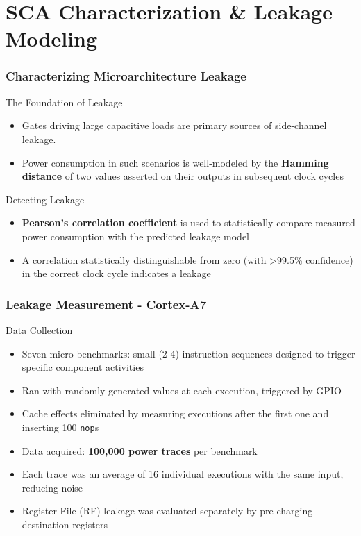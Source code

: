 \section{SCA Characterization \& Leakage Modeling}

\begin{frame}
    \frametitle{Characterizing Microarchitecture Leakage}
    \begin{block}{The Foundation of Leakage}
        \begin{itemize}
            \item Gates driving large capacitive loads are primary sources of side-channel leakage.
            \item Power consumption in such scenarios is well-modeled by the \textbf{Hamming distance} of two values asserted on their outputs in subsequent clock cycles
        \end{itemize}   
    \end{block}

    \begin{block}{Detecting Leakage}
        \begin{itemize}
            \item \textbf{Pearson's correlation coefficient} is used to statistically compare measured power consumption with the predicted leakage model
            \item A correlation statistically distinguishable from zero (with >99.5\% confidence) in the correct clock cycle indicates a leakage
        \end{itemize}
    \end{block}
\end{frame}


\begin{frame}
    \frametitle{Leakage Measurement - Cortex-A7}
    \begin{block}{Data Collection}
        \begin{itemize}
            \item Seven micro-benchmarks: small (2-4) instruction sequences designed to trigger specific component activities
            \item Ran with randomly generated values at each execution, triggered by GPIO
            \item Cache effects eliminated by measuring executions after the first one and inserting 100 \texttt{nop}s
            \item Data acquired: \textbf{100,000 power traces} per benchmark
            \item Each trace was an average of 16 individual executions with the same input, reducing noise
            \item Register File (RF) leakage was evaluated separately by pre-charging destination registers
        \end{itemize}
    \end{block}
\end{frame}

